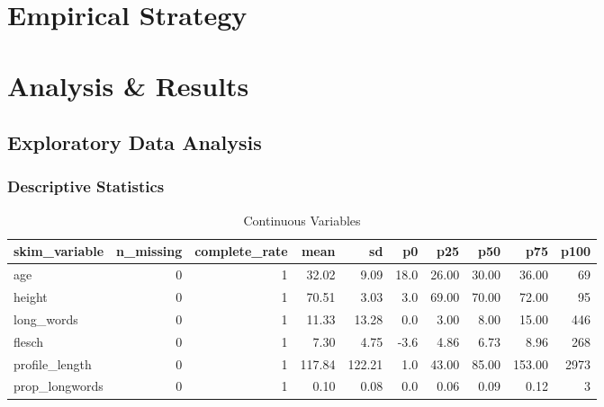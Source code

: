 \documentclass[]{article}
\begin{document}
\hypertarget{empirical-strategy}{%
\section{Empirical Strategy}\label{empirical-strategy}}

\hypertarget{analysis-results}{%
\section{Analysis \& Results}\label{analysis-results}}

\hypertarget{exploratory-data-analysis}{%
\subsection{Exploratory Data Analysis}\label{exploratory-data-analysis}}

\hypertarget{descriptive-statistics}{%
\subsubsection{Descriptive Statistics}\label{descriptive-statistics}}

\begin{table}

\caption{\label{tab:descr-stats-demo}Continuous Variables}
\centering
\begin{tabular}[t]{l|r|r|r|r|r|r|r|r|r}
\hline
skim\_variable & n\_missing & complete\_rate & mean & sd & p0 & p25 & p50 & p75 & p100\\
\hline
age & 0 & 1 & 32.02 & 9.09 & 18.0 & 26.00 & 30.00 & 36.00 & 69\\
\hline
height & 0 & 1 & 70.51 & 3.03 & 3.0 & 69.00 & 70.00 & 72.00 & 95\\
\hline
long\_words & 0 & 1 & 11.33 & 13.28 & 0.0 & 3.00 & 8.00 & 15.00 & 446\\
\hline
flesch & 0 & 1 & 7.30 & 4.75 & -3.6 & 4.86 & 6.73 & 8.96 & 268\\
\hline
profile\_length & 0 & 1 & 117.84 & 122.21 & 1.0 & 43.00 & 85.00 & 153.00 & 2973\\
\hline
prop\_longwords & 0 & 1 & 0.10 & 0.08 & 0.0 & 0.06 & 0.09 & 0.12 & 3\\
\hline
\end{tabular}
\end{table}
\end{document}
